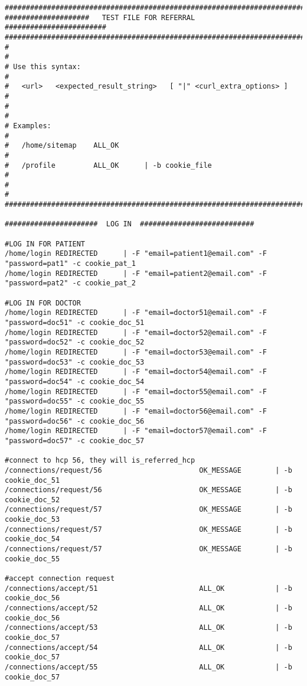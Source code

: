 \begin{verbatim}
########################################################################
####################   TEST FILE FOR REFERRAL   ########################
########################################################################
#                                                                      #
# Use this syntax:                                                     #
#   <url>   <expected_result_string>   [ "|" <curl_extra_options> ]    #
#                                                                      #
# Examples:                                                            #
#   /home/sitemap    ALL_OK                                            #
#   /profile         ALL_OK      | -b cookie_file                      #
#                                                                      #
########################################################################

######################  LOG IN  ###########################

#LOG IN FOR PATIENT
/home/login REDIRECTED		| -F "email=patient1@email.com" -F "password=pat1" -c cookie_pat_1
/home/login	REDIRECTED		| -F "email=patient2@email.com" -F "password=pat2" -c cookie_pat_2

#LOG IN FOR DOCTOR
/home/login	REDIRECTED		| -F "email=doctor51@email.com" -F "password=doc51" -c cookie_doc_51
/home/login	REDIRECTED		| -F "email=doctor52@email.com" -F "password=doc52" -c cookie_doc_52
/home/login	REDIRECTED		| -F "email=doctor53@email.com" -F "password=doc53" -c cookie_doc_53
/home/login	REDIRECTED		| -F "email=doctor54@email.com" -F "password=doc54" -c cookie_doc_54
/home/login REDIRECTED		| -F "email=doctor55@email.com" -F "password=doc55" -c cookie_doc_55
/home/login	REDIRECTED		| -F "email=doctor56@email.com" -F "password=doc56" -c cookie_doc_56
/home/login	REDIRECTED		| -F "email=doctor57@email.com" -F "password=doc57" -c cookie_doc_57

#connect to hcp 56, they will is_referred_hcp
/connections/request/56      	              OK_MESSAGE        | -b cookie_doc_51
/connections/request/56      	              OK_MESSAGE        | -b cookie_doc_52
/connections/request/57      	              OK_MESSAGE        | -b cookie_doc_53 
/connections/request/57      	              OK_MESSAGE        | -b cookie_doc_54
/connections/request/57      	              OK_MESSAGE        | -b cookie_doc_55 

#accept connection request
/connections/accept/51		 	              ALL_OK	        | -b cookie_doc_56           
/connections/accept/52		 	              ALL_OK	        | -b cookie_doc_56
/connections/accept/53		 	              ALL_OK	        | -b cookie_doc_57
/connections/accept/54		 	              ALL_OK	        | -b cookie_doc_57
/connections/accept/55		 	              ALL_OK	        | -b cookie_doc_57


\end{verbatim}
